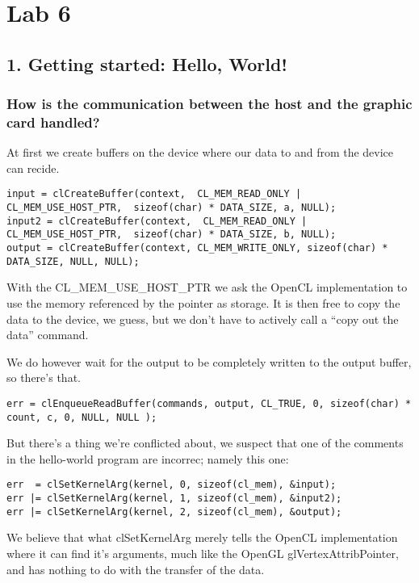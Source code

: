 \documentclass[a4paper,12pt]{article}
\begin{document}
\section{Lab 6}


\subsection{1. Getting started: Hello, World!}

\subsubsection{How is the communication between the host and the graphic card handled?}

At first we create buffers on the device where our data to and from the device can recide.

\begin{lstlisting}
input = clCreateBuffer(context,  CL_MEM_READ_ONLY | CL_MEM_USE_HOST_PTR,  sizeof(char) * DATA_SIZE, a, NULL);
input2 = clCreateBuffer(context,  CL_MEM_READ_ONLY | CL_MEM_USE_HOST_PTR,  sizeof(char) * DATA_SIZE, b, NULL);
output = clCreateBuffer(context, CL_MEM_WRITE_ONLY, sizeof(char) * DATA_SIZE, NULL, NULL);
\end{lstlisting}

With the CL\_MEM\_USE\_HOST\_PTR we ask the OpenCL implementation to use the memory referenced by the pointer as storage. It is then free to copy the data to the device, we guess, but we don't have to actively call a ``copy out the data'' command.

We do however wait for the output to be completely written to the output buffer, so there's that.

\begin{lstlisting}
err = clEnqueueReadBuffer(commands, output, CL_TRUE, 0, sizeof(char) * count, c, 0, NULL, NULL );
\end{lstlisting}

But there's a thing we're conflicted about, we suspect that one of the comments in the hello-world program are incorrec; namely this one:

\begin{lstlisting}
err  = clSetKernelArg(kernel, 0, sizeof(cl_mem), &input);
err |= clSetKernelArg(kernel, 1, sizeof(cl_mem), &input2);
err |= clSetKernelArg(kernel, 2, sizeof(cl_mem), &output);
\end{lstlisting}

We believe that what clSetKernelArg merely tells the OpenCL implementation where it can find it's arguments, much like the OpenGL glVertexAttribPointer, and has nothing to do with the transfer of the data.
\end{document}

